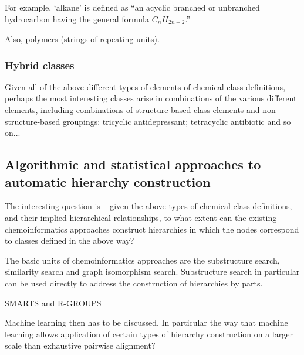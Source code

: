 \documentclass[10pt]{bmc_article}
\newenvironment{bmcformat}{\baselineskip20pt\sloppy\setboolean{publ}{false}}{\baselineskip20pt\sloppy}
\begin{document}
\begin{bmcformat}
For example, `alkane' is defined as ``an acyclic branched or unbranched hydrocarbon having the general formula $C_{n}H_{2n+2}$.'' 

Also, polymers (strings of repeating units).


\subsubsection*{Hybrid classes}

Given all of the above different types of elements of chemical class definitions, perhaps the most interesting classes arise in combinations of the various different elements, including combinations of structure-based class elements and non-structure-based groupings:  tricyclic antidepressant; tetracyclic antibiotic and so on...



\subsection*{Algorithmic and statistical approaches to automatic hierarchy construction}
\label{sec:resultscheminf}


The interesting question is -- given the above types of chemical class definitions, and their implied hierarchical relationships, to what extent can the existing chemoinformatics approaches construct hierarchies in which the nodes correspond to classes defined in the above way? 

The basic units of chemoinformatics approaches are the substructure search, similarity search and graph isomorphism search.  Substructure search in particular can be used directly to address the construction of hierarchies by parts. 

SMARTS and R-GROUPS

Machine learning then has to be discussed.  In particular the way that machine learning allows application of certain types of hierarchy construction on a larger scale than exhaustive pairwise alignment?  


\end{bmcformat}
\end{document}
